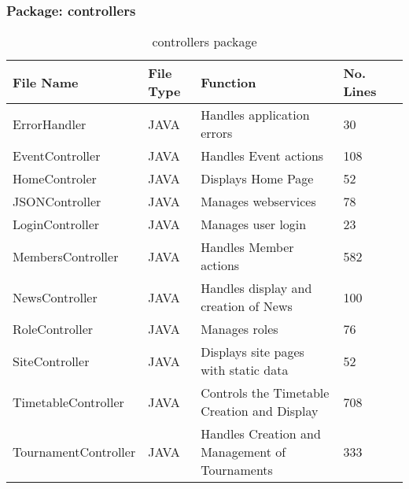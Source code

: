 \subsubsection{Package: controllers}
\begin{table}[H]
\begin{center}
   \begin{tabular}{| l | l | l| l |p{1cm} |}
    \hline
    File Name & File Type & Function & No. Lines\\ \hline
    ErrorHandler & JAVA & Handles application errors & 30 \\ \hline
	EventController & JAVA & Handles Event actions & 108\\ \hline
	HomeControler & JAVA & Displays Home Page & 52\\ \hline
	JSONController & JAVA & Manages webservices & 78\\ \hline
	LoginController & JAVA & Manages user login & 23\\ \hline
	MembersController & JAVA & Handles Member actions &  582\\ \hline
	NewsController & JAVA & Handles display and creation of News  & 100\\ \hline
	RoleController & JAVA & Manages roles & 76 \\ \hline
	SiteController & JAVA & Displays site pages with static data & 52\\ \hline
	TimetableController & JAVA & Controls the Timetable Creation and Display & 708 \\ \hline
	TournamentController & JAVA & Handles Creation and Management of Tournaments & 333 \\ \hline
    \end{tabular}
\end{center}
\caption{controllers package}
\end{table}


